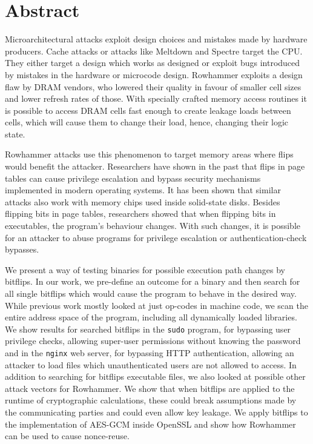 
{}
\chapter*{Abstract}
\label{cha:abstract}

Microarchitectural attacks exploit design choices and mistakes made by hardware
producers. Cache attacks or attacks like Meltdown and Spectre target the CPU.
They either target a design which works as designed or exploit bugs introduced
by mistakes in the hardware or microcode design. Rowhammer exploits a design
flaw by DRAM vendors, who lowered their quality in favour of smaller cell sizes
and lower refresh rates of those. With specially crafted memory access routines
it is possible to access DRAM cells fast enough to create leakage loads between
cells, which will cause them to change their load, hence, changing their logic
state.

Rowhammer attacks use this phenomenon to target memory areas where flips would
benefit the attacker. Researchers have shown in the past that flips in page
tables can cause privilege escalation and bypass security mechanisms implemented
in modern operating systems. It has been shown that similar attacks also work
with memory chips used inside solid-state disks. Besides flipping bits in page
tables, researchers showed that when flipping bits in executables, the program's
behaviour changes. With such changes, it is possible for an attacker to abuse
programs for privilege escalation or authentication-check bypasses.

We present a way of testing binaries for possible execution path changes by
bitflips. In our work, we pre-define an outcome for a binary and then search for
all single bitflips which would cause the program to behave in the desired way.
While previous work mostly looked at just op-codes in machine code, we scan
the entire address space of the program, including all dynamically loaded
libraries. We show results for searched bitflips in the \texttt{sudo} program,
for bypassing user privilege checks, allowing super-user permissions without
knowing the password and in the \texttt{nginx} web server, for bypassing HTTP
authentication, allowing an attacker to load files which unauthenticated users
are not allowed to access. In addition to searching for bitflips executable
files, we also looked at possible other attack vectors for Rowhammer. We show
that when bitflips are applied to the runtime of cryptographic calculations,
these could break assumptions made by the communicating parties and could even
allow key leakage. We apply bitflips to the implementation of AES-GCM inside
OpenSSL and show how Rowhammer can be used to cause nonce-reuse.


